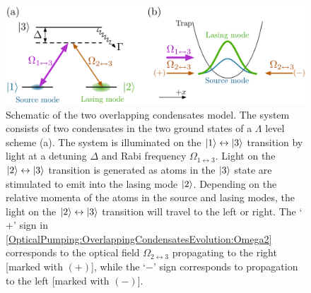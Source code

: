 \begin{figure}
    \centering
    \includegraphics[width=14cm]{OverlappingCondensateModel}
    \caption{Schematic of the two overlapping condensates model.  The system consists of two condensates in the two ground states of a $\Lambda$ level scheme (a).  The system is illuminated on the ${\left|1\right>}\leftrightarrow{\ensuremath{\left|3\right>}}$ transition by light at a detuning $\Delta$ and Rabi frequency $\Omega_{1\leftrightarrow 3}$.  Light on the ${\left|2\right>} \leftrightarrow {\ensuremath{\left|3\right>}}$ transition is generated as atoms in the ${\left|3\right>}$ state are stimulated to emit into the lasing mode ${\left|2\right>}$.  Depending on the relative momenta of the atoms in the source and lasing modes, the light on the ${\left|2\right>} \leftrightarrow {\ensuremath{\left|3\right>}}$ transition will travel to the left or right.  The `$+$' sign in \eqref{OpticalPumping:OverlappingCondensatesEvolution:Omega2} corresponds to the optical field $\Omega_{2\leftrightarrow 3}$ propagating to the right [marked with $(+)$], while the `$-$' sign corresponds to propagation to the left [marked with $(-)$].}
    \label{OpticalPumping:OverlappingCondensateModel}
\end{figure}

